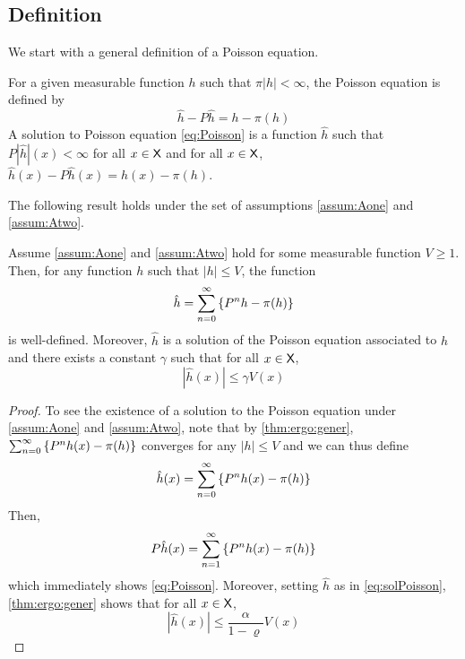 \documentclass[english,graybox,envcountchap,envcountsame,sectrefs,shortlabels]{svmono}
\theoremstyle{style}
\newenvironment{svmultproof}{\small \begin{proof}}{\end{proof}}
\begin{document}
\subsection{Definition}
We start with a general definition of a Poisson equation.
\begin{framed}
\begin{definition} 
For a given measurable function $h$ such that $\pi|h|<\infty$, the Poisson equation is defined by
\begin{equation} \label{eq:Poisson}
\hat h - P \hat h=h-\pi(h)
\end{equation}
A solution to Poisson equation \eqref{eq:Poisson} is a function $\hat h$ such that $P|\hat h|(x)<\infty$ for all $x\in\mathsf{X}$ and for all $x\in\mathsf{X}$, $\hat h(x) - P \hat h(x)=h(x)-\pi(h)$.

\end{definition}
\end{framed}
The following result holds under the set of assumptions \ref{assum:Aone} and \ref{assum:Atwo}.
\begin{shaded}
 \begin{theorem} \label{thm:solPoiss}
 Assume \ref{assum:Aone} and \ref{assum:Atwo} hold for some measurable function $V\geq 1$. Then, for any function $h$ such that $|h|\leq V$, the function
\begin{equation}\label{eq:solPoisson}
\hat h=\sum_{n=0}^\infty \left\{ P^n h-\pi(h)\right\}
\end{equation}
is well-defined. Moreover, $\hat h$ is a solution of the Poisson equation associated to $h$ and there exists a constant $\gamma$ such that  for all $x\in\mathsf{X}$,
$$
|\hat h(x)|\leq \gamma V(x)
$$
 \end{theorem}

\end{shaded}

 \begin{svmultproof}
To see the existence of a solution to the Poisson equation under \ref{assum:Aone} and \ref{assum:Atwo}, note that by \autoref{thm:ergo:gener}, $\sum_{n=0}^\infty \left\{ P^n h(x)-\pi(h)\right\}$ converges for any $|h|\leq V$ and we can thus define
\begin{equation*}
\hat h(x)=\sum_{n=0}^\infty \left\{ P^n h(x)-\pi(h)\right\}
\end{equation*}
Then,
$$
P \hat h(x)=\sum_{n=1}^\infty \left\{ P^n h(x)-\pi(h)\right\}
$$
which immediately shows \eqref{eq:Poisson}. Moreover, setting $\hat h$ as in \eqref{eq:solPoisson}, \autoref{thm:ergo:gener} shows that for all $x\in\mathsf{X}$,
$$
|\hat h(x)|\leq \frac{\alpha}{1-\varrho} V(x)
$$
 \end{svmultproof}
\end{document}

